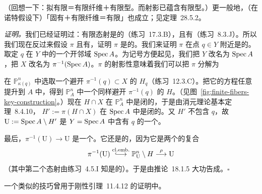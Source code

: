 （回想一下：拟有限＝有限纤维＋有限型。而射影已蕴含有限型。）更一般地，（在诺特假设下）「固有＋有限纤维＝有限」也成立；见\mbox{定理~28.5.2}。

\emph{证明。}\quad 我们已经证明过：有限态射是\trProjective{}的（\mbox{练习~17.3.B}），且有\trFinite\trFiber（\mbox{练习~8.3.J}）。所以我们现在反过来假设 $\pi$ \trProjective{}且有\trFinite\trFiber，证明 $\pi$ 是\trFinite{}的。我们来证明 $\pi$ 在点 $q\in Y$ 附近是\trFinite{}的。取定 $q$ 在 $Y$ 中的一个\trAffine{}开邻域 $\operatorname{Spec} A$。为记号方便起见，我们把 $Y$ 改名为 $\operatorname{Spec} A$，把 $X$ 改名为 $\pi^{-1}(\operatorname{Spec} A)$。$\pi$ 的射影性意味着我们可以把 $\pi$ 分解为
在 $\mathbb{P}^n_{\kappa(q)}$ 中选取一个避开 $\pi^{-1}(q)\subset X$ 的\trHypersurface{} $H_q$（\mbox{练习~12.3.C}）。把它的方程任意提升到 $A$ 中，得到 $\mathbb{P}^n_A$ 中一个同样避开 $\pi^{-1}(q)$ 的\trHypersurface{} $H$。（见图~\ref{fig:finite-fibers-key-construction}。）现在 $H\cap X$ 在 $\mathbb{P}^n_A$ 中是闭的，于是由消元理论基本定理~8.4.10，
$H':=\pi(H\cap X)$ 在 $\operatorname{Spec} A$ 中是闭的。又 $H'$ 不包含 $q$，故 $\mathrm{U}:=\operatorname{Spec} A\setminus H'$ 是 $Y=\operatorname{Spec} A$ 中含有 $q$ 的一个\trOpenSubset。

最后，$\pi^{-1}(\mathrm{U})\to\mathrm{U}$ 是一个\trProjective\trMorphism。它还是\trAffine{}的，因为它是两个\trAffine\trMorphism{}的复合
\[
\pi^{-1}(\mathrm{U})\overset{\mathrm{cl.emb.}}{\lhook\joinrel\longrightarrow}\mathbb{P}^n_{\mathrm{U}}\setminus H\overset{\rho}{\longrightarrow}\mathrm{U}
\]
（其中第二个态射由\mbox{练习~4.5.I} 知是\trAffine{}的）。于是由\mbox{推论~18.1.5} 大功告成。\hfill$\square$

一个类似的技巧曾用于\mbox{刚性引理~11.4.12} 的证明中。

